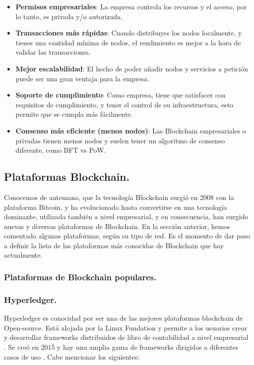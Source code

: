 \begin{itemize}
\item \textbf{Permisos empresariales}: La empresa controla los recursos y el acceso, por lo tanto, es privada y/o 
autorizada.

\item \textbf{Transacciones más rápidas}: Cuando distribuyes los nodos localmente, y tienes una cantidad mínima de 
nodos, el rendimiento es mejor a la hora de validar las transacciones.

\item \textbf{Mejor escalabilidad}: El hecho de poder añadir nodos y servicios a petición puede ser una gran ventaja 
para la empresa.

\item \textbf{Soporte de cumplimiento}: Como empresa, tiene que satisfacer con requisitos de cumplimiento, y tener el 
control de su infraestructura, esto permite que se cumpla más fácilmente.

\item \textbf{Consenso más eficiente (menos nodos)}: Las Blockchain empresariales o privadas tienen menos nodos y 
suelen tener un algoritmo de consenso diferente, como BFT vs PoW.
\end{itemize}

\subsection{Plataformas Blockchain.}

Conocemos de antemano, que la tecnología Blockchain surgió en 2008 con la plataforma Bitcoin, y ha evolucionado hasta
convertirse en una tecnología dominante, utilizada también a nivel empresarial, y en consecuencia, han surgido nuevas y 
diversas plataformas de Blockchain. En la sección anterior, hemos comentado algunas plataformas, según su tipo de red.
Es el momento de dar paso a definir la lista de las plataformas más conocidas de Blockchain que hay actualmente.

\subsubsection{Plataformas de Blockchain populares.}

\subsubsection*{Hyperledger.}

Hyperledger es conocidad por ser una de las mejores plataformas blockchain de Open-source. Está alojada por la Linux 
Fundation y permite a los usuarios crear y desarrollar frameworks distribuidos de libro de contabilidad a nivel 
empresarial \cite{top-blockchain-platforms}. Se creó en 2015 y hay una amplia gama de frameworks dirigidos a diferentes 
casos de uso \cite{top-blockchain-platforms-app}. Cabe mencionar los siguientes: 
    
